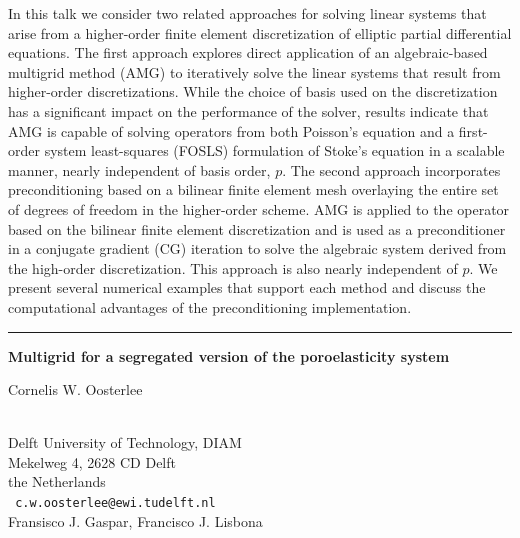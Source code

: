 \documentclass[twosided]{report}
\begin{document}
In this talk we consider two related approaches for solving linear
systems that arise from a higher-order finite element discretization of
elliptic partial differential equations. The first approach explores
direct application of an algebraic-based multigrid method (AMG) to
iteratively solve the linear systems that result from higher-order
discretizations. While the choice of basis used on the discretization
has a significant impact on the performance of the solver, results
indicate that AMG is capable of solving operators from both Poisson's
equation and a first-order system least-squares (FOSLS) formulation of
Stoke's equation in a scalable manner, nearly independent of basis
order, $p$. The second approach incorporates preconditioning based on a
bilinear finite element mesh overlaying the entire set of degrees of
freedom in the higher-order scheme. AMG is applied to the operator
based on the bilinear finite element discretization and is used as a
preconditioner in a conjugate gradient (CG) iteration to solve the
algebraic system derived from the high-order discretization. This
approach is also nearly independent of $p$. We present several numerical
examples that support each method and discuss the computational
advantages of the preconditioning implementation.

\begin{center}

\rule{6in}{1pt}
\end{center}

\begin{center}
{\large			\label{oosterlee}
{\bf
Multigrid for a segregated version of the poroelasticity system
}

Cornelis W. Oosterlee} \\
Delft University of Technology, DIAM \\
Mekelweg 4, 2628 CD Delft \\
the Netherlands
\\ {\tt
c.w.oosterlee@ewi.tudelft.nl
}
\\
Fransisco J. Gaspar,  Francisco J. Lisbona
\end{center}
\end{document}

